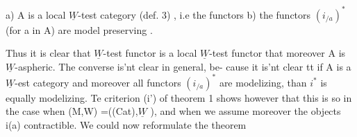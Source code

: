 a) A is a local $\underline{W}$-test category (def. 3) , i.e\hand{,} the functors
b) the functors $(i_{/a})^*$ (for a in A) are model preserving .

Thus it is clear that   $\underline{W}$-test functor  is a local $\underline{W}$-test functor  
that moreover A is $\underline{W}$-aspheric. The converse is'nt clear in general, be-%
cause it is'nt clear tt if A is a $\underline{W}$-est category and moreover all
functors $(i_{/a})^*$ are modelizing, than $i^*$ is equally modelizing. Te
criterion (i') of theorem 1 shows however that this is so in the case
when (M,W) =((Cat),$\underline{W}$ ), and when we assume moreover the objects i(a)
contractible.  We could now reformulate the theorem
